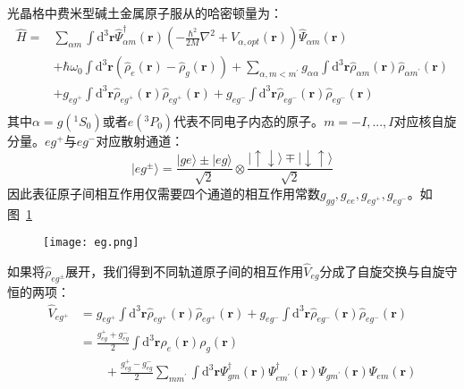 光晶格中费米型碱土金属原子服从的哈密顿量为：
\begin{equation}
\begin{aligned}
\hat{H}=& \sum_{\alpha m} \int \mathrm{d}^{3} \mathbf{r} \hat{\Psi}_{\alpha m}^{\dagger}(\mathbf{r})\left(-\frac{\hbar^{2}}{2 M} \nabla^{2}+V_{\alpha,opt}(\mathbf{r})\right) \hat{\Psi}_{\alpha m}(\mathbf{r}) \\
&+\hbar \omega_{0} \int \mathrm{d}^{3} \mathbf{r}\left(\hat{\rho}_{e}(\mathbf{r})-\hat{\rho}_{g}(\mathbf{r})\right)+ \sum_{\alpha, m<m^{\prime}} g_{\alpha \alpha} \int \mathrm{d}^{3} \mathbf{r} \hat{\rho}_{\alpha m}(\mathbf{r}) \hat{\rho}_{\alpha m^{\prime}}(\mathbf{r})  \\
&+ g_{e g^+} \int \mathrm{d}^{3} \mathbf{r} \hat{\rho}_{eg^+}(\mathbf{r}) \hat{\rho}_{eg^+}(\mathbf{r})+g_{e g^-} \int \mathrm{d}^{3} \mathbf{r} \hat{\rho}_{eg^-}(\mathbf{r}) \hat{\rho}_{eg^-}(\mathbf{r})\\
\end{aligned}
\end{equation}
其中$\alpha=g({^1S_0})$或者$e({}^3P_0)$代表不同电子内态的原子。$m=-I,...,I$对应核自旋分量。$eg^+$与$eg^-$对应散射通道：
\begin{equation}
|eg^{\pm}\rangle = \frac{|ge\rangle\pm|eg\rangle}{\sqrt{2}}\otimes\frac{|\uparrow\downarrow\rangle\mp|\downarrow\uparrow \rangle}{\sqrt{2}}
\end{equation}
因此表征原子间相互作用仅需要四个通道的相互作用常数$g_{gg},g_{ee},g_{eg^+},g_{eg^-}$。如图~\ref{eg}~
\begin{figure}[!htbp]
    \centering
    \texttt{[image: eg.png]}
    \label{eg}
\end{figure}
如果将$\hat{\rho}_{eg^\pm}$展开，我们得到不同轨道原子间的相互作用$\hat{V}_{eg}$分成了自旋交换与自旋守恒的两项：
\begin{equation}
\begin{aligned}
\hat{V}_{eg^+} &= g_{e g^+} \int \mathrm{d}^{3} \mathbf{r} \hat{\rho}_{eg^+}(\mathbf{r}) \hat{\rho}_{eg^+}(\mathbf{r})+g_{e g^-} \int \mathrm{d}^{3} \mathbf{r} \hat{\rho}_{eg^-}(\mathbf{r}) \hat{\rho}_{eg^-}(\mathbf{r})\\
\quad &= \frac{g_{e g}^{+}+g_{e g}^{-}}{2} \int \mathrm{d}^{3} \mathbf{r} \rho_{e}(\mathbf{r}) \rho_{g}(\mathbf{r}) \\ 
&\quad \quad + \frac{g_{e g}^{+}-g_{e g}^{-}}{2} \sum_{m m^{\prime}} \int \mathrm{d}^{3} \mathbf{r} \Psi_{g m}^{\dagger}(\mathbf{r}) \Psi_{e m^{\prime}}^{\dagger}(\mathbf{r}) \Psi_{g m^{\prime}}(\mathbf{r}) \Psi_{e m}(\mathbf{r})
\end{aligned}
\end{equation}
